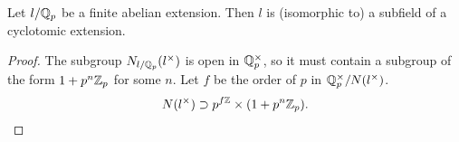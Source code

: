 \begin{theorem} \label{thm:local Kronecker Weber}
	Let $l/{\mathbb Q}_p$ be a finite abelian extension.
	Then $l$ is (isomorphic to) a subfield of a cyclotomic extension.
\end{theorem}


\begin{proof}
	The subgroup $N_{l/{\mathbb Q}_p}(l^\times)$ is open in ${\mathbb Q}_p^\times$, so it must contain
	a subgroup of the form $1+p^n{\mathbb Z}_p$ for some $n$.
	Let $f$ be the order of $p$ in ${\mathbb Q}_p^\times / N(l^\times)$.
	\[
		N(l^\times) \supset p^{f{\mathbb Z}} \times (1 + p^n{\mathbb Z}_p).
	\]
\end{proof}
